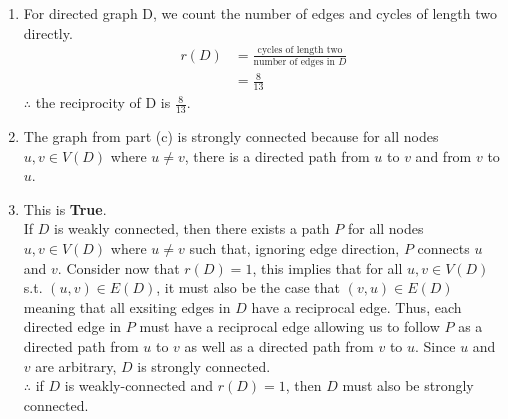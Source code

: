 \documentclass{article}
\begin{document}
\begin{enumerate}[label=(\alph*), left=10pt, itemsep=10pt]
        \addtocounter{enumi}{1}
        \item \begin{minipage}[t]{0.9\textwidth}
                For directed graph D, we count the number of edges and cycles of length two
                directly.
                \begin{align*}
                    r(D) &= \frac{\text{cycles of length two}}{\text{number of edges in }D}\\
                        &= \frac{8}{13}
                \end{align*}
                $\therefore$ the reciprocity of D is $\displaystyle\frac{8}{13}$.
            \end{minipage}

        \item \begin{minipage}[t]{0.9\textwidth}
                The graph from part (c) is strongly connected because for all nodes
                $u,v \in V(D)$ where $u \neq v$, there is a directed path from $u$ to $v$
                and from $v$ to $u$.
            \end{minipage}

        \item \begin{minipage}[t]{0.9\textwidth}
            This is \textbf{True}.\\
            If $D$ is weakly connected, then there exists a path $P$ for all nodes
            $u,v \in V(D)$ where $u \neq v$ such that, ignoring edge direction, $P$
            connects $u$ and $v$. Consider now that $r(D) = 1$, this implies that for all
            $u,v \in V(D)$ s.t. $(u,v) \in E(D)$, it must also be the case that
            $(v,u) \in E(D)$ meaning that all exsiting edges in $D$ have a reciprocal edge.
            Thus, each directed edge in $P$ must have a reciprocal edge allowing us to follow
            $P$ as a directed path from $u$ to $v$ as well as a directed path from $v$ to $u$.
            Since $u$ and $v$ are arbitrary, $D$ is strongly connected.\\

            $\therefore$ if $D$ is weakly-connected and $r(D)=1$, then $D$ must also be
            strongly connected.
        
        \end{minipage}


\end{enumerate}
\end{document}
